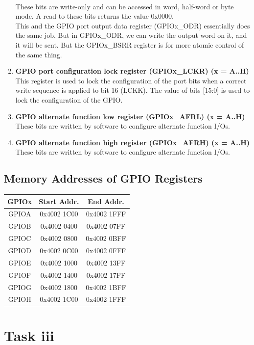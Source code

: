 \documentclass[12pt]{article}
\begin{document}
\begin{enumerate}
   \\These bits are write-only and can be accessed in word, half-word or byte mode. A read to these bits returns the value 0x0000. 
   \\This and the GPIO port output data register (GPIOx\_ODR) essentially does the same job. But in GPIOx\_ODR, we can write the output word on it, and it will be sent. But the GPIOx\_BSRR register is for more atomic control of the same thing.
   \item \textbf{GPIO port configuration lock register (GPIOx\_LCKR) (x = A..H)}
    \\ This register is used to lock the configuration of the port bits when a correct write sequence is applied to bit 16 (LCKK). The value of bits [15:0] is used to lock the configuration of the GPIO.
    \item \textbf{GPIO alternate function low register (GPIOx\_AFRL) (x = A..H)}
    \\ These bits are written by software to configure alternate function I/Os.
    \item \textbf{GPIO alternate function high register (GPIOx\_AFRH) (x = A..H)}
    \\ These bits are written by software to configure alternate function I/Os.
\end{enumerate}
\subsection{Memory Addresses of GPIO Registers}
\begin{tabular}{ |c|c|c| }
    \hline
    \textbf{GPIOx} & \textbf{Start Addr.} & \textbf{End Addr.} \\
    \hline
    GPIOA & 0x4002 1C00 & 0x4002 1FFF \\
    \hline
    GPIOB & 0x4002 0400 & 0x4002 07FF \\
    \hline
    GPIOC & 0x4002 0800 & 0x4002 0BFF \\
    \hline
    GPIOD & 0x4002 0C00 & 0x4002 0FFF \\
    \hline
    GPIOE & 0x4002 1000 & 0x4002 13FF \\
    \hline
    GPIOF & 0x4002 1400 & 0x4002 17FF \\
    \hline
    GPIOG & 0x4002 1800 & 0x4002 1BFF \\
    \hline
    GPIOH & 0x4002 1C00 & 0x4002 1FFF \\
    \hline
\end{tabular}
\pagebreak
\section{Task iii}
\end{document}
